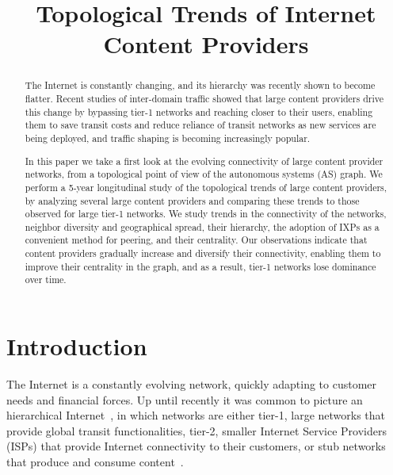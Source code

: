 \documentclass[conference]{IEEEtran}
\begin{document}
\title{Topological Trends of Internet Content Providers}

\author{
\and
{}
}

\maketitle

\begin{abstract} The Internet is constantly changing, and its hierarchy was recently shown to become flatter. 
Recent studies of inter-domain traffic showed that
large content providers drive this change
by bypassing tier-1 networks and reaching closer to their users, enabling them to save transit costs
and reduce reliance of transit networks as new services are being deployed, and traffic shaping is becoming
increasingly popular. 

In this paper we take a first look at the evolving connectivity of large content provider
networks, from a topological point of view of the autonomous systems (AS) graph.
We perform a 5-year longitudinal study of the topological trends of large content providers, by analyzing several
large content providers and comparing these trends to those observed
for large tier-1 networks. We study trends in the connectivity of the networks, 
neighbor diversity and geographical spread, their hierarchy, the adoption of IXPs as a convenient method for peering,
and their centrality. Our observations indicate that content providers gradually increase
and diversify their connectivity, enabling them to improve their centrality in the graph, and as a result,
tier-1 networks lose dominance over time. 
\end{abstract}


\section{Introduction}
\label{introduction}
The Internet is a constantly evolving network, quickly adapting to customer needs and
financial forces.
Up until recently
it was common to picture an hierarchical Internet~\cite{ge01hierarchical,dimitropoulos-2006-37,medusa-pnas}, in which networks are
either tier-1, large networks that provide global transit functionalities,
tier-2, smaller
Internet Service Providers (ISPs) that provide Internet connectivity to
their customers, or stub networks that produce and consume
content~\cite{tiers}.
\end{document}
